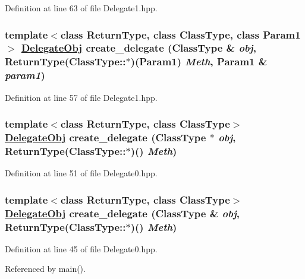 Definition at line 63 of file Delegate1.hpp.\hypertarget{namespaceDL_a3}{
\subsubsection[create\_\-delegate]{\setlength{\rightskip}{0pt plus 5cm}template$<$class Return\-Type, class Class\-Type, class Param1$>$ \hyperlink{namespaceDL_a0}{Delegate\-Obj} create\_\-delegate (Class\-Type \& {\em obj}, Return\-Type(Class\-Type::$\ast$)(Param1) {\em Meth}, Param1 \& {\em param1})}}
\label{namespaceDL_a3}




Definition at line 57 of file Delegate1.hpp.\hypertarget{namespaceDL_a2}{
\subsubsection[create\_\-delegate]{\setlength{\rightskip}{0pt plus 5cm}template$<$class Return\-Type, class Class\-Type$>$ \hyperlink{namespaceDL_a0}{Delegate\-Obj} create\_\-delegate (Class\-Type $\ast$ {\em obj}, Return\-Type(Class\-Type::$\ast$)() {\em Meth})}}
\label{namespaceDL_a2}




Definition at line 51 of file Delegate0.hpp.\hypertarget{namespaceDL_a1}{
\subsubsection[create\_\-delegate]{\setlength{\rightskip}{0pt plus 5cm}template$<$class Return\-Type, class Class\-Type$>$ \hyperlink{namespaceDL_a0}{Delegate\-Obj} create\_\-delegate (Class\-Type \& {\em obj}, Return\-Type(Class\-Type::$\ast$)() {\em Meth})}}
\label{namespaceDL_a1}




Definition at line 45 of file Delegate0.hpp.

Referenced by main().